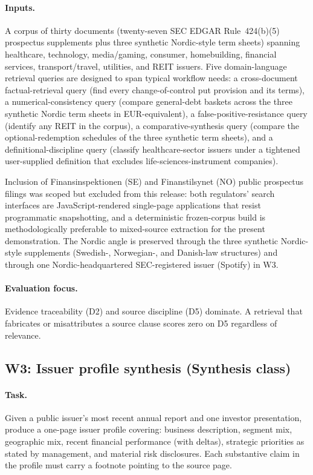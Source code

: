 \documentclass[11pt]{article}
\begin{document}
\paragraph{Inputs.} A corpus of thirty documents (twenty-seven SEC EDGAR Rule~424(b)(5) prospectus supplements plus three synthetic Nordic-style term sheets) spanning healthcare, technology, media/gaming, consumer, homebuilding, financial services, transport/travel, utilities, and REIT issuers. Five domain-language retrieval queries are designed to span typical workflow needs: a cross-document factual-retrieval query (find every change-of-control put provision and its terms), a numerical-consistency query (compare general-debt baskets across the three synthetic Nordic term sheets in EUR-equivalent), a false-positive-resistance query (identify any REIT in the corpus), a comparative-synthesis query (compare the optional-redemption schedules of the three synthetic term sheets), and a definitional-discipline query (classify healthcare-sector issuers under a tightened user-supplied definition that excludes life-sciences-instrument companies).

Inclusion of Finansinspektionen (SE) and Finanstilsynet (NO) public prospectus filings was scoped but excluded from this release: both regulators' search interfaces are JavaScript-rendered single-page applications that resist programmatic snapshotting, and a deterministic frozen-corpus build is methodologically preferable to mixed-source extraction for the present demonstration. The Nordic angle is preserved through the three synthetic Nordic-style supplements (Swedish-, Norwegian-, and Danish-law structures) and through one Nordic-headquartered SEC-registered issuer (Spotify) in W3.

\paragraph{Evaluation focus.} Evidence traceability (D2) and source discipline (D5) dominate. A retrieval that fabricates or misattributes a source clause scores zero on D5 regardless of relevance.

\subsection{W3: Issuer profile synthesis (Synthesis class)}

\paragraph{Task.} Given a public issuer's most recent annual report and one investor presentation, produce a one-page issuer profile covering: business description, segment mix, geographic mix, recent financial performance (with deltas), strategic priorities as stated by management, and material risk disclosures. Each substantive claim in the profile must carry a footnote pointing to the source page.
\end{document}
